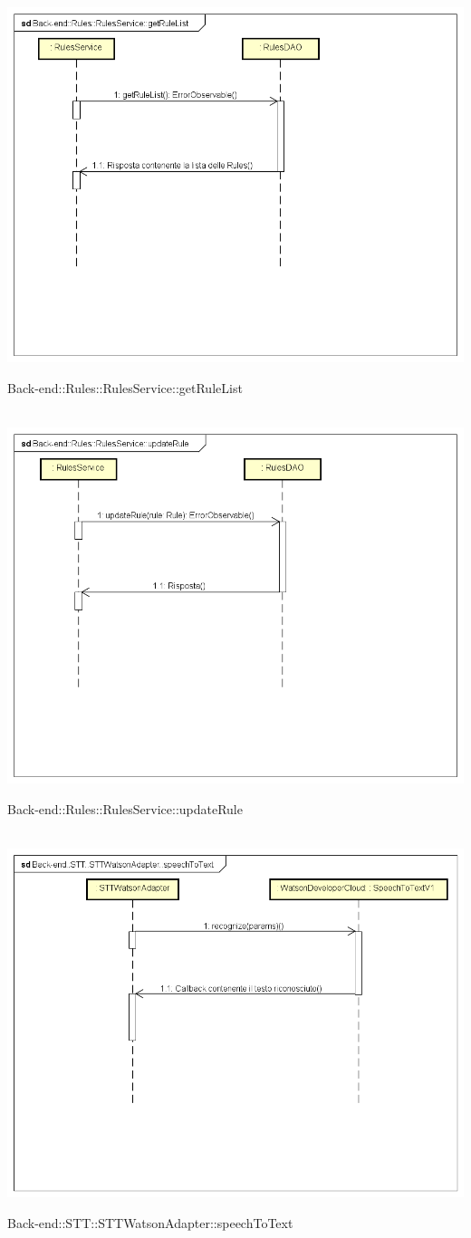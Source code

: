 \\ \includegraphics[width=\textwidth,height=\textheight,keepaspectratio]{images/diagrams/back-end/Ufficial_Backend/Back-end__Rules__RulesService__getRuleList.png} 	\caption{Back-end::Rules::RulesService::getRuleList}
\\ \includegraphics[width=\textwidth,height=\textheight,keepaspectratio]{images/diagrams/back-end/Ufficial_Backend/Back-end__Rules__RulesService__updateRule.png} 	\caption{Back-end::Rules::RulesService::updateRule}
\\ \includegraphics[width=\textwidth,height=\textheight,keepaspectratio]{images/diagrams/back-end/Ufficial_Backend/Back-end__STT__STTWatsonAdapter__speechToText.png} 	\caption{Back-end::STT::STTWatsonAdapter::speechToText}
